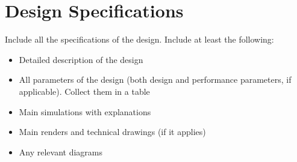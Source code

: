 \chapter{Design Specifications} \label{chapter:design-specifications}

Include all the specifications of the design. Include at least the following:

\begin{itemize}
    \item Detailed description of the design
    \item All parameters of the design (both design and performance parameters, if applicable). Collect them in a table
    \item Main simulations with explanations
    \item Main renders and technical drawings (if it applies)
    \item Any relevant diagrams 
\end{itemize}